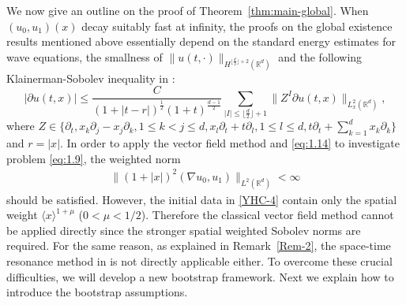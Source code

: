 \documentclass[11pt,twoside]{article}
\theoremstyle{plain}
\theoremstyle{definition}
\theoremstyle{assumption}
\numberwithin{equation}{section}
\begin{document}
	We now give an outline on the proof of Theorem~\ref{thm:main-global}. When
	$(u_0,u_1)(x)$ decay suitably fast at infinity, the proofs on the global existence results mentioned above  essentially
depend on the standard energy estimates for wave
	equations, the smallness of $\|u(t,\cdot)\|_{H^{\lfloor \frac{d}{2} \rfloor+2}(\mathbb{R}^d)}$ and the following Klainerman-Sobolev inequality in \cite{Klainerman3}:
	\begin{equation}\label{eq:1.14}
		|\partial u(t,x)| \leq \frac{C}{(1+|t-r|)^{\frac{1}{2}}(1+t)^{\frac{d-1}{2}}}
		\sum_{|I| \leq \lfloor \frac{d}{2} \rfloor+1} \|Z^I \partial u(t,x)\|_{L_x^2(\mathbb{R}^d)},
	\end{equation}
	where $Z \in \{\partial_t, x_k\partial_j-x_j\partial_k, 1\leq k<j \leq d, x_l\partial_t+t\partial_l, 1\leq l\leq d, t\partial_t + \sum\limits_{k=1}^d x_k\partial_k\}$ and $r=|x|$.
	In order to apply the vector field method and \eqref{eq:1.14} to investigate problem \eqref{eq:1.9}, the weighted norm
	\begin{equation}\label{YHCCC-20}
		\begin{split}
			\|(1+|x|)^2(\nabla u_0,u_1)\|_{L^2(\mathbb{R}^d)}<\infty
		\end{split}
	\end{equation}
	should be satisfied.  However, the
	initial data in \eqref{YHC-4} contain only the spatial weight $\langle x\rangle^{1+\mu}$
($0<\mu<1/2$). Therefore the classical vector field method cannot be applied directly since
 the stronger spatial weighted Sobolev norms are required. For the same reason, as explained in Remark~\ref{Rem-2},
 the space-time resonance method in \cite{Pusateri} is not directly applicable either.
 To overcome these crucial difficulties, we will develop a new bootstrap framework.
 Next we  explain how to introduce the bootstrap assumptions.
\end{document}
